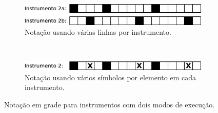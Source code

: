 \begin{figure}[h]
    \centering 
\begin{subfigure}[c]{0.9\textwidth}
\includegraphics[width=\textwidth]{chapters/cap-musica-basica/gridnotation2a.eps}
\caption{Notação usando várias linhas por instrumento.}
\label{fig:gridnotation2a}
\end{subfigure}
~%
\begin{subfigure}[c]{0.9\textwidth}
\includegraphics[width=\textwidth]{chapters/cap-musica-basica/gridnotation2b.eps}
\caption{Notação usando vários símbolos por elemento em cada instrumento.}
\label{fig:gridnotation2b}
\end{subfigure}
    \caption{Notação em grade para instrumentos com dois modos de execução.}\label{fig:gridnotation2}
\end{figure}


